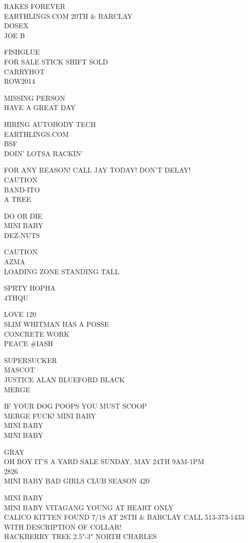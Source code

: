 \documentclass[10pt,letterpaper]{article}
\begin{document}
RAKES FOREVER\\
EARTHLINGS.COM 20TH \& BARCLAY\\
DOSEX\\
JOE B

FISHGLUE\\
FOR SALE STICK SHIFT SOLD\\
CARRYHOT\\
ROW2014

MISSING PERSON\\
HAVE A GREAT DAY

HIRING AUTOBODY TECH\\
EARTHLINGS.COM\\
BSF\\
DOIN' LOTSA RACKIN'

FOR ANY REASON!  CALL JAY TODAY!  DON'T DELAY!\\
CAUTION\\
BAND{-}ITO\\
A TREE

DO OR DIE\\
MINI BABY\\
DEZ{-}NUTS

CAUTION\\
AZMA\\
LOADING ZONE STANDING TALL

SPRTY HOPHA\\
4THQU

LOVE 120\\
SLIM WHITMAN HAS A POSSE\\
CONCRETE WORK\\
PEACE \#IASH

SUPERSUCKER\\
MASCOT\\
JUSTICE ALAN BLUEFORD BLACK\\
MERGE

IF YOUR DOG POOPS YOU MUST SCOOP\\
MERGE FUCK! MINI BABY\\
MINI BABY\\
MINI BABY

GRAY\\
OH BOY IT'S A YARD SALE SUNDAY, MAY 24TH 9AM{-}1PM\\
2826\\
MINI BABY BAD GIRLS CLUB SEASON 420

MINI BABY\\
MINI BABY VITAGANG YOUNG AT HEART ONLY\\
CALICO KITTEN FOUND 7/18 AT 28TH \& BARCLAY CALL 513{-}373{-}1433 WITH DESCRIPTION OF COLLAR!\\
HACKBERRY TREE 2.5"{-}3" NORTH CHARLES
\end{document}
